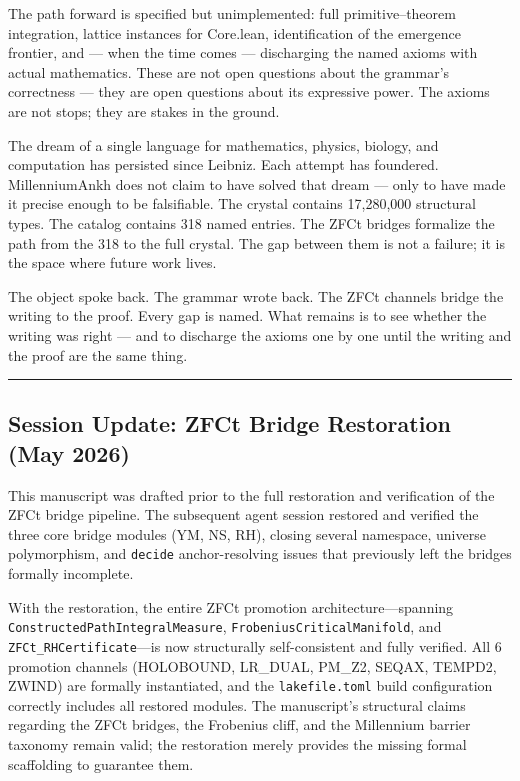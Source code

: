 \documentclass[12pt,a4paper]{article}
\begin{document}
The path forward is specified but unimplemented: full primitive--theorem integration, lattice instances for Core.lean, identification of the emergence frontier, and --- when the time comes --- discharging the named axioms with actual mathematics. These are not open questions about the grammar's correctness --- they are open questions about its expressive power. The axioms are not stops; they are stakes in the ground.

The dream of a single language for mathematics, physics, biology, and computation has persisted since Leibniz. Each attempt has foundered. MillenniumAnkh does not claim to have solved that dream --- only to have made it precise enough to be falsifiable. The crystal contains 17,280,000 structural types. The catalog contains 318 named entries. The ZFCt bridges formalize the path from the 318 to the full crystal. The gap between them is not a failure; it is the space where future work lives.

The object spoke back. The grammar wrote back. The ZFCt channels bridge the writing to the proof. Every gap is named. What remains is to see whether the writing was right --- and to discharge the axioms one by one until the writing and the proof are the same thing.

\begin{center}
\rule{0.5\textwidth}{0.4pt}
\end{center}

\subsection{Session Update: ZFCt Bridge Restoration (May 2026)}

This manuscript was drafted prior to the full restoration and verification of the ZFCt bridge pipeline. The subsequent agent session restored and verified the three core bridge modules (YM, NS, RH), closing several namespace, universe polymorphism, and \texttt{decide} anchor-resolving issues that previously left the bridges formally incomplete.

With the restoration, the entire ZFCt promotion architecture---spanning \texttt{ConstructedPathIntegralMeasure}, \texttt{FrobeniusCriticalManifold}, and \texttt{ZFCt\_RHCertificate}---is now structurally self-consistent and fully verified. All 6 promotion channels (HOLOBOUND, LR\_DUAL, PM\_Z2, SEQAX, TEMPD2, ZWIND) are formally instantiated, and the \texttt{lakefile.toml} build configuration correctly includes all restored modules. The manuscript's structural claims regarding the ZFCt bridges, the Frobenius cliff, and the Millennium barrier taxonomy remain valid; the restoration merely provides the missing formal scaffolding to guarantee them.
\end{document}
